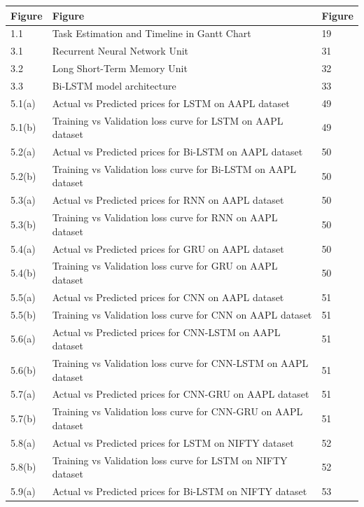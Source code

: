 \documentclass[12pt,a4paper]{report}
\begin{document}
\begin{table}[htbp]
\centering
\begin{tabular}{|l|l|l|}
\hline
\textbf{Figure} & \textbf{Figure} & \textbf{Figure} \\
\hline
1.1 & Task Estimation and Timeline in Gantt Chart & 19 \\
\hline
3.1 & Recurrent Neural Network Unit & 31 \\
\hline
3.2 & Long Short-Term Memory Unit & 32 \\
\hline
3.3 & Bi-LSTM model architecture & 33 \\
\hline
5.1(a) & Actual vs Predicted prices for LSTM on AAPL dataset & 49 \\
\hline
5.1(b) & Training vs Validation loss curve for LSTM on AAPL dataset & 49 \\
\hline
5.2(a) & Actual vs Predicted prices for Bi-LSTM on AAPL dataset & 50 \\
\hline
5.2(b) & Training vs Validation loss curve for Bi-LSTM on AAPL dataset & 50 \\
\hline
5.3(a) & Actual vs Predicted prices for RNN on AAPL dataset & 50 \\
\hline
5.3(b) & Training vs Validation loss curve for RNN on AAPL dataset & 50 \\
\hline
5.4(a) & Actual vs Predicted prices for GRU on AAPL dataset & 50 \\
\hline
5.4(b) & Training vs Validation loss curve for GRU on AAPL dataset & 50 \\
\hline
5.5(a) & Actual vs Predicted prices for CNN on AAPL dataset & 51 \\
\hline
5.5(b) & Training vs Validation loss curve for CNN on AAPL dataset & 51 \\
\hline
5.6(a) & Actual vs Predicted prices for CNN-LSTM on AAPL dataset & 51 \\
\hline
5.6(b) & Training vs Validation loss curve for CNN-LSTM on AAPL dataset & 51 \\
\hline
5.7(a) & Actual vs Predicted prices for CNN-GRU on AAPL dataset & 51 \\
\hline
5.7(b) & Training vs Validation loss curve for CNN-GRU on AAPL dataset & 51 \\
\hline
5.8(a) & Actual vs Predicted prices for LSTM on NIFTY dataset & 52 \\
\hline
5.8(b) & Training vs Validation loss curve for LSTM on NIFTY dataset & 52 \\
\hline
5.9(a) & Actual vs Predicted prices for Bi-LSTM on NIFTY dataset & 53 \\

\end{tabular}
\end{table}
\end{document}
